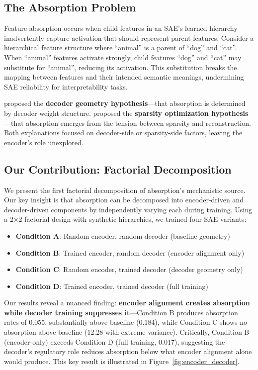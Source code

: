 \documentclass{article}
\begin{document}
\subsection{The Absorption Problem}

Feature absorption occurs when child features in an SAE's learned hierarchy inadvertently capture activation that should represent parent features. Consider a hierarchical feature structure where ``animal'' is a parent of ``dog'' and ``cat''. When ``animal'' features activate strongly, child features ``dog'' and ``cat'' may substitute for ``animal'', reducing its activation. This substitution breaks the mapping between features and their intended semantic meanings, undermining SAE reliability for interpretability tasks.

\citet{chanin2024absorption} proposed the \textbf{decoder geometry hypothesis}---that absorption is determined by decoder weight structure. \citet{korznikov2026sanity} proposed the \textbf{sparsity optimization hypothesis}---that absorption emerges from the tension between sparsity and reconstruction. Both explanations focused on decoder-side or sparsity-side factors, leaving the encoder's role unexplored.

\subsection{Our Contribution: Factorial Decomposition}

We present the first factorial decomposition of absorption's mechanistic source. Our key insight is that absorption can be decomposed into encoder-driven and decoder-driven components by independently varying each during training. Using a 2$\times$2 factorial design with synthetic hierarchies, we trained four SAE variants:

\begin{itemize}
\item \textbf{Condition A}: Random encoder, random decoder (baseline geometry)
\item \textbf{Condition B}: Trained encoder, random decoder (encoder alignment only)
\item \textbf{Condition C}: Random encoder, trained decoder (decoder geometry only)
\item \textbf{Condition D}: Trained encoder, trained decoder (full training)
\end{itemize}

Our results reveal a nuanced finding: \textbf{encoder alignment creates absorption while decoder training suppresses it}---Condition B produces absorption rates of 0.055, substantially above baseline (0.184), while Condition C shows no absorption above baseline (12.28 with extreme variance). Critically, Condition B (encoder-only) exceeds Condition D (full training, 0.017), suggesting the decoder's regulatory role reduces absorption below what encoder alignment alone would produce. This key result is illustrated in Figure~\ref{fig:encoder_decoder}.
\end{document}
